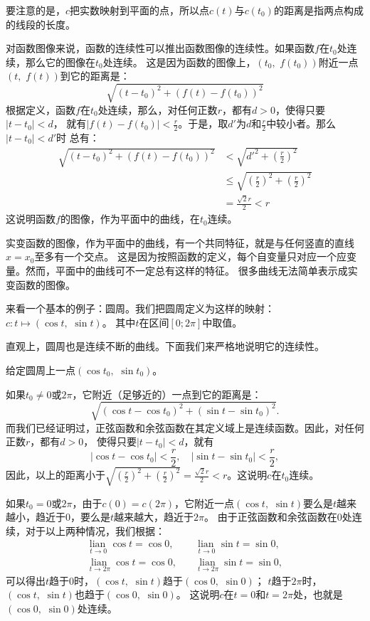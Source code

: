 \documentclass[12pt,UTF8]{ctexbook}
\newcommand{\lian}[1]{
    \underset{#1}{\operatorname{lian}\,}
}
\begin{document}
要注意的是，$c$把实数映射到平面的点，所以点$c(t)$与$c(t_0)$的距离是指两点构成的线段的长度。

对函数图像来说，函数的连续性可以推出函数图像的连续性。如果函数$f$在$t_0$处连续，那么它的图像在$t_0$处连续。
这是因为函数的图像上，$(t_0,\,\, f(t_0))$附近一点$(t,\,\, f(t))$到它的距离是：
$$ \sqrt{(t - t_0)^2 + (f(t) - f(t_0))^2} $$
根据定义，函数$f$在$t_0$处连续，那么，对任何正数$r$，都有$d>0$，使得只要$|t - t_0| < d$，
就有$|f(t) - f(t_0)| < \frac{r}{2}$。于是，取$d'$为$d$和$\frac{r}{2}$中较小者。那么$|t - t_0| < d'$时
总有：
\begin{align*}
    \sqrt{(t - t_0)^2 + (f(t) - f(t_0))^2} &< \sqrt{d'^2 + \left(\frac{r}{2}\right)^2}  \\
    &\leqslant \sqrt{\left(\frac{r}{2}\right)^2 + \left(\frac{r}{2}\right)^2}  \\
    &= \frac{\sqrt{2}r}{2} < r 
\end{align*}
这说明函数$f$的图像，作为平面中的曲线，在$t_0$连续。

实变函数的图像，作为平面中的曲线，有一个共同特征，就是与任何竖直的直线$x = x_0$至多有一个交点。
这是因为按照函数的定义，每个自变量只对应一个应变量。然而，平面中的曲线可不一定总有这样的特征。
很多曲线无法简单表示成实变函数的图像。

来看一个基本的例子：圆周。我们把圆周定义为这样的映射：$c: t\mapsto (\cos{t}, \,\, \sin{t})$。
其中$t$在区间$[0;2\pi]$中取值。

直观上，圆周也是连续不断的曲线。下面我们来严格地说明它的连续性。

给定圆周上一点$(\cos{t_0}, \,\, \sin{t_0})$。

如果$t_0 \neq 0$或$2\pi$，它附近（足够近的）一点到它的距离是：
$$ \sqrt{(\cos{t} - \cos{t_0})^2 + (\sin{t} - \sin{t_0})^2}. $$
而我们已经证明过，正弦函数和余弦函数在其定义域上是连续函数。因此，对任何正数$r$，都有$d>0$，
使得只要$|t - t_0| < d$，就有
$$ |\cos{t} - \cos{t_0}| < \frac{r}{2}, \quad |\sin{t} - \sin{t_0}| < \frac{r}{2}, $$
因此，以上的距离小于$\sqrt{\left(\frac{r}{2}\right)^2 + \left(\frac{r}{2}\right)^2} = \frac{\sqrt{2}r}{2} < r$。这说明$c$在$t_0$连续。

如果$t_0 = 0$或$2\pi$，由于$c(0) = c(2\pi)$，它附近一点$(\cos{t}, \,\, \sin{t})$要么是$t$越来越小，趋近于$0$，要么是$t$越来越大，趋近于$2\pi$。
由于正弦函数和余弦函数在$0$处连续，对于以上两种情况，我们根据：
\begin{align*}
    \lian{t \to 0} \cos{t} = \cos{0}, \quad &\lian{t \to 0} \sin{t} = \sin{0},  \\
    \lian{t \to 2\pi} \cos{t} = \cos{0}, \quad &\lian{t \to 2\pi} \sin{t} = \sin{0},  
\end{align*}
可以得出$t$趋于$0$时，$(\cos{t}, \,\, \sin{t})$趋于$(\cos{0}, \,\, \sin{0})$；
$t$趋于$2\pi$时，$(\cos{t}, \,\, \sin{t})$也趋于$(\cos{0}, \,\, \sin{0})$。
这说明$c$在$t=0$和$t=2\pi$处，也就是$(\cos{0}, \,\, \sin{0})$处连续。
\end{document}

